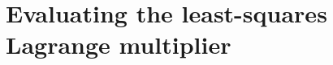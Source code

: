 



\section{Evaluating the least-squares Lagrange multiplier}
\label{sec:cobyqa-lagrange-multipliers}

